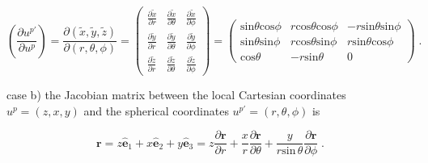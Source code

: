 \documentclass[extra,mreferee]{gji}
\begin{document}
\begin{equation}
\left( \frac{\partial u^{p'}}{\partial u^p} \right) = \frac{\partial(\tilde{x},\tilde{y},\tilde{z})}{\partial(r,\theta,\phi)}  
                    =\begin{pmatrix}                                                   
\frac{\partial \tilde{x}}{\partial r}  & \frac{\partial \tilde{x}}{\partial \theta} & \frac{\partial \tilde{x}}{\partial \phi} \\
\frac{\partial \tilde{y}}{\partial r}  & \frac{\partial \tilde{y}}{\partial \theta} & \frac{\partial \tilde{y}}{\partial \phi} \\ 
\frac{\partial \tilde{z}}{\partial r}  & \frac{\partial \tilde{z}}{\partial \theta} & \frac{\partial \tilde{z}}{\partial \phi}                                                  
                    \end{pmatrix}  
                    =\begin{pmatrix}  
\mathrm{sin}\theta\mathrm{cos}\phi  & r\mathrm{cos}\theta\mathrm{cos}\phi & -r\mathrm{sin}\theta\mathrm{sin}\phi \\
\mathrm{sin}\theta\mathrm{sin}\phi  & r\mathrm{cos}\theta\mathrm{sin}\phi & r\mathrm{sin}\theta\mathrm{cos}\phi \\ 
\mathrm{cos}\theta                  & -r\mathrm{sin}\theta                & 0 
                   \end{pmatrix} \; .\label{eq:jacobian_globalTOspher}
\end{equation}

case b) the Jacobian matrix between the local Cartesian coordinates $u^{p}=(z,x,y)$ and the spherical coordinates $u^{p'}=(r,\theta,\phi)$ is 

\begin{equation}
\mathbf{r} = z \hat{\mathbf{e}}_1 + x \hat{\mathbf{e}}_2 + y \hat{\mathbf{e}}_3 = z \frac{\partial \mathbf{r}}{\partial r}+ \frac{x}{r} \frac{\partial \mathbf{r}}{\partial \theta} + \frac{y}{r\mathrm{sin}\,\theta} \frac{\partial \mathbf{r}}{\partial \phi} \; . \label{eq:pos_vec_2}
\end{equation}

\end{document}
